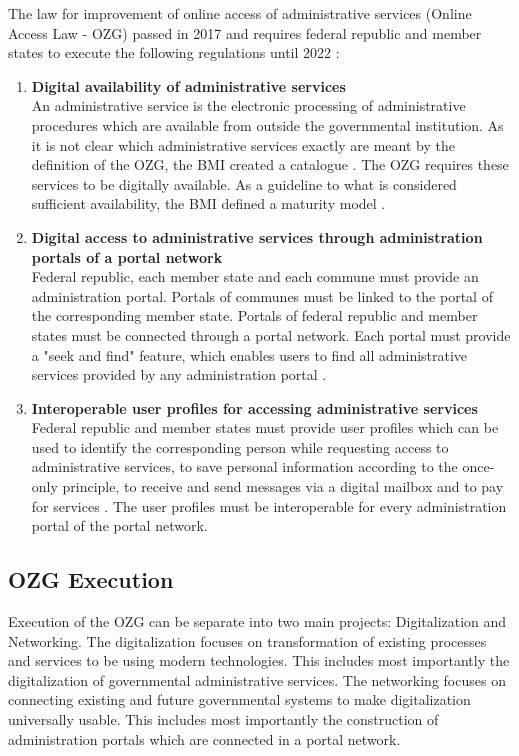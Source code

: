 \documentclass[
     12pt,         %
     a4paper,      %
     BCOR=10mm,version=first,     %
     DIV=14,version=first,        %
     ]{scrreprt}
\begin{document}
The law for improvement of online access of administrative services (Online Access Law - OZG) passed in 2017 and requires federal republic and member states to execute the following regulations until 2022 \cite{BMI:OZG_Wortlaut}:
\begin{enumerate}
    \item \textbf{Digital availability of administrative services} \\
    An administrative service is the electronic processing of administrative procedures which are available from outside the governmental institution.  As it is not clear which administrative services exactly are meant by the definition of the OZG, the BMI created a catalogue \cite{BMI:Verwaltungsleistungen}. The OZG requires these services to be digitally available. As a guideline to what is considered sufficient availability, the BMI defined a maturity model \cite{BMI:Digitale_Services}.
    \item \textbf{Digital access to administrative services through administration portals of a portal network} \\
    Federal republic, each member state and each commune must provide an administration portal. Portals of communes must be linked to the portal of the corresponding member state. Portals of federal republic and member states must be connected through a portal network. \cite{BMI:Portalverbund} Each portal must provide a "seek and find" feature, which enables users to find all administrative services provided by any administration portal \cite{Cotar:Drucksache_19/19089}. 
    \item \textbf{Interoperable user profiles for accessing administrative services} \\
    Federal republic and member states must provide user profiles which can be used to identify the corresponding person while requesting access to administrative services, to save personal information according to the once-only principle, to receive and send messages via a digital mailbox and to pay for services \cite{Cotar:Drucksache_19/19089}. The user profiles must be interoperable for every administration portal of the portal network.
\end{enumerate}

\subsection{OZG Execution}

Execution of the OZG can be separate into two main projects: Digitalization and Networking. The digitalization focuses on transformation of existing processes and services to be using modern technologies. This includes most importantly the digitalization of governmental administrative services. The networking focuses on connecting existing and future governmental systems to make digitalization universally usable. This includes most importantly the construction of administration portals which are connected in a portal network.
\end{document}
